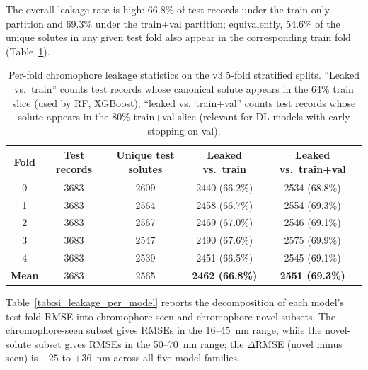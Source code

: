 \documentclass[journal=jcisd8,manuscript=suppinfo]{achemso}
\begin{document}
The overall leakage rate is high: 66.8\% of test records under the train-only partition and 69.3\% under the train+val partition; equivalently, 54.6\% of the unique solutes in any given test fold also appear in the corresponding train fold (Table~\ref{tab:si_leakage_perfold}).

\begin{table}[htbp]
\centering
\caption{Per-fold chromophore leakage statistics on the v3 5-fold stratified splits. ``Leaked vs.\ train'' counts test records whose canonical solute appears in the 64\% train slice (used by RF, XGBoost); ``leaked vs.\ train+val'' counts test records whose solute appears in the 80\% train+val slice (relevant for DL models with early stopping on val).}
\label{tab:si_leakage_perfold}
\small
\begin{tabular}{ccccc}
\toprule
\textbf{Fold} & \textbf{Test records} & \textbf{Unique test solutes} & \textbf{Leaked vs.\ train} & \textbf{Leaked vs.\ train+val} \\
\midrule
0 & 3683 & 2609 & 2440 (66.2\%) & 2534 (68.8\%) \\
1 & 3683 & 2564 & 2458 (66.7\%) & 2554 (69.3\%) \\
2 & 3683 & 2567 & 2469 (67.0\%) & 2546 (69.1\%) \\
3 & 3683 & 2547 & 2490 (67.6\%) & 2575 (69.9\%) \\
4 & 3683 & 2539 & 2451 (66.5\%) & 2545 (69.1\%) \\
\midrule
\textbf{Mean} & 3683 & 2565 & \textbf{2462 (66.8\%)} & \textbf{2551 (69.3\%)} \\
\bottomrule
\end{tabular}
\end{table}

Table~\ref{tab:si_leakage_per_model} reports the decomposition of each model's test-fold RMSE into chromophore-seen and chromophore-novel subsets. The chromophore-seen subset gives RMSEs in the 16--45~nm range, while the novel-solute subset gives RMSEs in the 50--70~nm range; the $\Delta$RMSE (novel minus seen) is $+25$ to $+36$~nm across all five model families.
\end{document}
